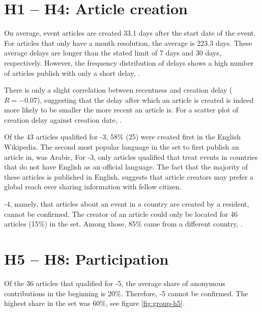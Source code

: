 
\section{H1 -- H4: Article creation}

On average, event articles are created 33.1 days after the start date of the event.
For articles that only have a month resolution, the average  is 223.3 days.
These average delays are longer than the stated limit of 7 days and 30 days, respectively.
However, the frequency distribution of delays shows a high number of articles publish with only a short delay, . 


There is only a slight correlation between recentness and creation delay ($R = -0.07$), suggesting that the delay after which an article is created is indeed more likely to be smaller the more recent an article is.
For a scatter plot of  creation delay against creation date, .


Of the 43 articles qualified for \hyp{3}, 58\% (25) were created first in the English Wikipedia.  
The second most popular language in the set to first publish an article in, was Arabic, 
For \hyp{3}, only articles qualified that treat events in countries that do not have English as an official language. 
The fact that the majority of these articles is published in English, suggests that article creators may prefer a global reach over sharing information with fellow citizen.


\hyp{4}, namely, that articles about an event in a country are created by a resident, cannot be confirmed. 
The creator of an article could only be located for 46 articles (15\%) in the set. 
Among those, 85\% came from a different country, .


\section{H5 -- H8: Participation}

Of the 36 articles that qualified for \hyp{5}, the average share of anonymous contributions in the beginning is 20\%.
Therefore, \hyp{5} cannot be confirmed.
The highest share in the set was 60\%, see figure \ref{fig:group-h5}.

